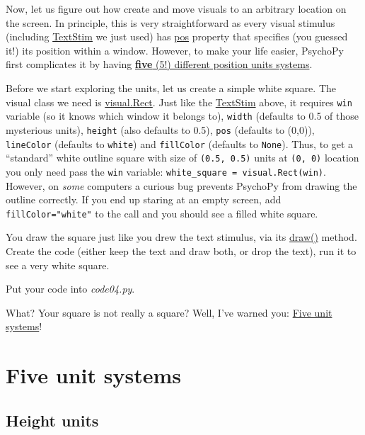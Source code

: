 \documentclass[
]{book}
\begin{document}
Now, let us figure out how create and move visuals to an arbitrary location on the screen. In principle, this is very straightforward as every visual stimulus (including \href{https://psychopy.org/api/visual/textstim.html\#psychopy.visual.TextStim}{TextStim} we just used) has \href{https://psychopy.org/api/visual/textstim.html\#psychopy.visual.TextStim.pos}{pos} property that specifies (you guessed it!) its position within a window. However, to make your life easier, PsychoPy first complicates it by having \href{https://psychopy.org/general/units.html}{\textbf{five} (5!) different position units systems}.

Before we start exploring the units, let us create a simple white square. The visual class we need is \href{https://psychopy.org/api/visual/rect.html}{visual.Rect}. Just like the \href{https://psychopy.org/api/visual/textstim.html\#psychopy.visual.TextStim}{TextStim} above, it requires \texttt{win} variable (so it knows which window it belongs to), \texttt{width} (defaults to 0.5 of those mysterious units), \texttt{height} (also defaults to 0.5), \texttt{pos} (defaults to (0,0)), \texttt{lineColor} (defaults to \texttt{white}) and \texttt{fillColor} (defaults to \texttt{None}). Thus, to get a ``standard'' white outline square with size of \texttt{(0.5,\ 0.5)} units at \texttt{(0,\ 0)} location you only need pass the \texttt{win} variable: \texttt{white\_square\ =\ visual.Rect(win)}. However, on \emph{some} computers a curious bug prevents PsychoPy from drawing the outline correctly. If you end up staring at an empty screen, add \texttt{fillColor="white"} to the call and you should see a filled white square.

You draw the square just like you drew the text stimulus, via its \href{https://psychopy.org/api/visual/rect.html\#psychopy.visual.rect.Rect.draw}{draw()} method. Create the code (either keep the text and draw both, or drop the text), run it to see a very white square.

Put your code into \emph{code04.py}.

What? Your square is not really a square? Well, I've warned you: \href{https://psychopy.org/general/units.html\#units}{Five unit systems}!

\hypertarget{psychopy-units}{%
\section{Five unit systems}\label{psychopy-units}}

\hypertarget{psychopy-units-height}{%
\subsection{Height units}\label{psychopy-units-height}}
\end{document}
